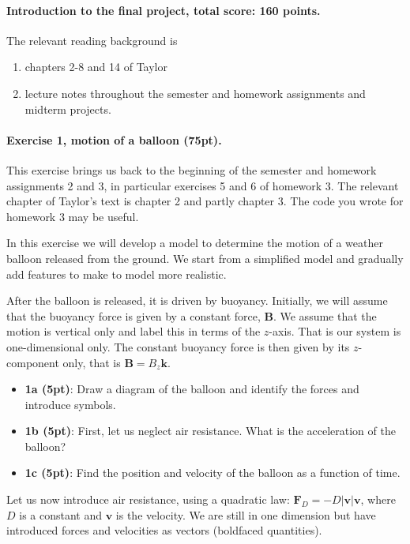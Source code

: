 \documentclass[%
oneside,                 %
final,                   %
10pt]{article}
\begin{document}
\noindent
\paragraph{Introduction to the final project, total score: 160  points.}
The relevant reading background is
\begin{enumerate}
\item chapters 2-8 and 14 of Taylor

\item lecture notes throughout the semester and homework assignments and midterm projects.
\end{enumerate}

\noindent
\paragraph{Exercise 1, motion of a balloon (75pt).}
This exercise brings us back to the beginning of the semester and
homework assignments 2 and 3, in particular exercises 5 and 6 of
homework 3. The relevant chapter of Taylor's text is chapter 2 and
partly chapter 3. The code you wrote for homework 3 may be useful.

In this exercise we will develop a model to determine the motion of a
weather balloon released from the ground. We start from a simplified
model and gradually add features to make to model more realistic.

After the balloon is released, it is driven by buoyancy. Initially, we will assume that the buoyancy force is given by a constant force, $\bm{B}$.
We assume that the motion is vertical only and label this in terms of the $z$-axis.  That is our system is one-dimensional only.
The constant buoyancy force is then given by its $z$-component only, that is $\bm{B}=B_z\bm{k}$.
\begin{itemize}
\item \textbf{1a (5pt)}: Draw a diagram of the balloon and identify the forces and introduce symbols. 

\item \textbf{1b (5pt)}: First, let us neglect air resistance. What is the acceleration of the balloon?

\item \textbf{1c (5pt)}: Find the position and velocity of the balloon as a function of time.
\end{itemize}

\noindent
Let us now introduce air resistance, using a quadratic law: $\bm{F}_D = −D \vert \bm{v}\vert \bm{v}$, where $D$ is a constant and $\bm{v}$ is the velocity. We are still in one dimension but have introduced forces and velocities as vectors (boldfaced quantities).
\end{document}

